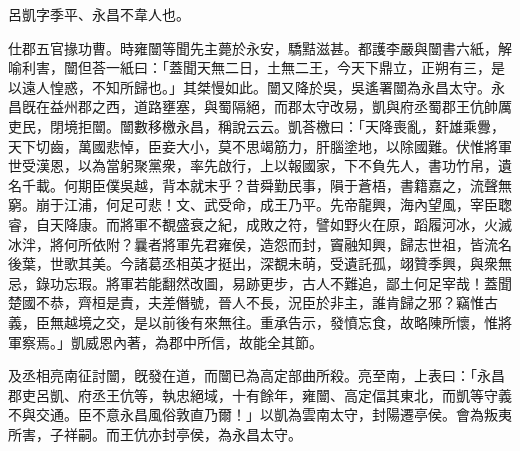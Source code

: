 \begin{pinyinscope}
 
 
 呂凱字季平、永昌不韋人也。
 
 
 仕郡五官掾功曹。時雍闓等聞先主薨於永安，驕黠滋甚。都護李嚴與闓書六紙，解喻利害，闓但荅一紙曰：「蓋聞天無二日，土無二王，今天下鼎立，正朔有三，是以遠人惶惑，不知所歸也。」其桀慢如此。闓又降於吳，吳遙署闓為永昌太守。永昌旣在益州郡之西，道路壅塞，與蜀隔絕，而郡太守改易，凱與府丞蜀郡王伉帥厲吏民，閉境拒闓。闓數移檄永昌，稱說云云。凱荅檄曰：「天降喪亂，姧雄乘釁，天下切齒，萬國悲悼，臣妾大小，莫不思竭筋力，肝腦塗地，以除國難。伏惟將軍世受漢恩，以為當躬聚黨衆，率先啟行，上以報國家，下不負先人，書功竹帛，遺名千載。何期臣僕吳越，背本就末乎？昔舜勤民事，隕于蒼梧，書籍嘉之，流聲無窮。崩于江浦，何足可悲！文、武受命，成王乃平。先帝龍興，海內望風，宰臣聦睿，自天降康。而將軍不覩盛衰之紀，成敗之符，譬如野火在原，蹈履河冰，火滅冰泮，將何所依附？曩者將軍先君雍侯，造怨而封，竇融知興，歸志世祖，皆流名後葉，世歌其美。今諸葛丞相英才挺出，深覩未萌，受遺託孤，翊贊季興，與衆無忌，錄功忘瑕。將軍若能翻然改圖，易跡更步，古人不難追，鄙土何足宰哉！蓋聞楚國不恭，齊桓是責，夫差僭號，晉人不長，況臣於非主，誰肯歸之邪？竊惟古義，臣無越境之交，是以前後有來無往。重承告示，發憤忘食，故略陳所懷，惟將軍察焉。」凱威恩內著，為郡中所信，故能全其節。
 
 
及丞相亮南征討闓，旣發在道，而闓已為高定部曲所殺。亮至南，上表曰：「永昌郡吏呂凱、府丞王伉等，執忠絕域，十有餘年，雍闓、高定偪其東北，而凱等守義不與交通。臣不意永昌風俗敦直乃爾！」以凱為雲南太守，封陽遷亭侯。會為叛夷所害，子祥嗣。而王伉亦封亭侯，為永昌太守。
 
 
\end{pinyinscope}